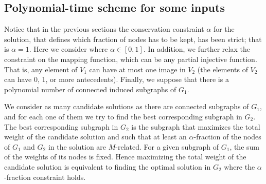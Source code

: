 		\subsection{Polynomial-time scheme for some inputs}
		\label{subsec:enumerable}

			Notice that in the previous sections the conservation constraint $\alpha$ for the solution, that defines which fraction of nodes has to be kept, has been strict; that is $\alpha = 1$.
			Here we consider where $\alpha \in [0,1]$.
			In addition, we further relax the constraint on the mapping function, which can be any partial injective function.
			That is, any element of $V_1$ can have at most one image in $V_2$ (the elements of $V_2$ can have 0, 1, or more antecedents).
			Finally, we suppose that there is a polynomial number of connected induced subgraphs of $G_1$.

			We consider as many candidate solutions as there are connected subgraphs of $G_1$, and for each one of them we try to find the best corresponding subgraph in $G_2$.
			The best corresponding subgraph in $G_2$ is the subgraph that maximizes the total weight of the candidate solution and such that at least an $\alpha$-fraction of the nodes of $G_1$ and $G_2$ in the solution are $M$-related.
			For a given subgraph of $G_1$, the sum of the weights of its nodes is fixed.
			Hence maximizing the total weight of the candidate solution is equivalent to finding the optimal solution in $G_2$ where the $\alpha$-fraction constraint holds.

